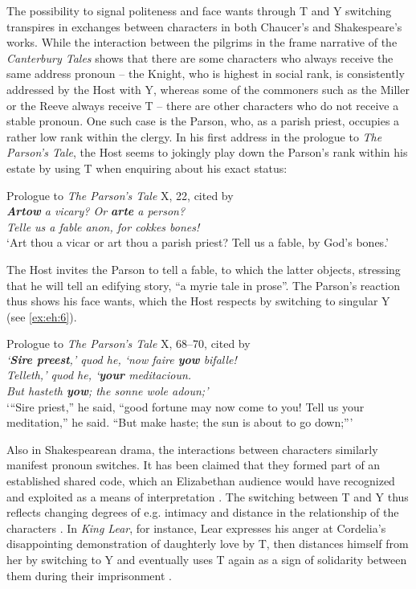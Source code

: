 \documentclass[output=paper,hidelinks]{langscibook}
\begin{document}
The possibility to signal politeness and face wants through T and Y switching transpires in exchanges between characters in both Chaucer’s and Shakespeare’s works. While the interaction between the pilgrims in the frame narrative of the \textit{Canterbury Tales} shows that there are some characters who always receive the same address pronoun – the Knight, who is highest in social rank, is consistently addressed by the Host with Y, whereas some of the commoners such as the Miller or the Reeve always receive T \citep[79--80]{Jucker2013} – there are other characters who do not receive a stable pronoun. One such case is the Parson, who, as a parish priest, occupies a rather low rank within the clergy. In his first address in the prologue to \textit{The Parson’s Tale}, the Host seems to jokingly play down the Parson’s rank within his estate by using T when enquiring about his exact status:

\ea \label{ex:eh:5} 
	Prologue to \textit{The Parson’s Tale} X, 22, cited by \citet[81]{Jucker2013}\\
	\textit{\textbf{Artow} a vicary? Or \textbf{arte} a person?\\
	Telle us a fable anon, for cokkes bones!\\}
	\enquote*{Art thou a vicar or art thou a parish priest? Tell us a fable, by God’s bones.}
\z

The Host invites the Parson to tell a fable, to which the latter objects, stressing that he will tell an edifying story, \enquote{a myrie tale in prose}. The Parson’s reaction thus shows his face wants, which the Host respects by switching to singular Y (see \ref{ex:eh:6}).

\ea \label{ex:eh:6} 
	Prologue to \textit{The Parson’s Tale} X, 68–70, cited by \citet[81]{Jucker2013}\\
	\textit{\enquote*{\textbf{Sire preest},} quod he, \enquote*{now faire \textbf{yow} bifalle!\\
 Telleth,} quod he, \enquote*{\textbf{your} meditacioun.\\
	But hasteth \textit{\textbf{yow}}; the sonne wole adoun;}\\}
\enquote*{“Sire priest,” he said, “good fortune may now come to you! Tell us your meditation,” he said. “But make haste; the sun is about to go down;”}
\z

Also in Shakespearean drama, the interactions between characters similarly manifest pronoun switches. It has been claimed that they formed part of an established shared code, which an Elizabethan audience would have recognized and exploited as a means of interpretation \citep[25--26]{Mazzon1995}. The switching between T and Y thus reflects changing degrees of e.g. intimacy and distance in the relationship of the characters \citep[240]{Mazzon2003}. In \textit{King Lear}, for instance, Lear expresses his anger at Cordelia’s disappointing demonstration of daughterly love by T, then distances himself from her by switching to Y and eventually uses T again as a sign of solidarity between them during their imprisonment \citep[230]{Mazzon2003}.
\end{document}
